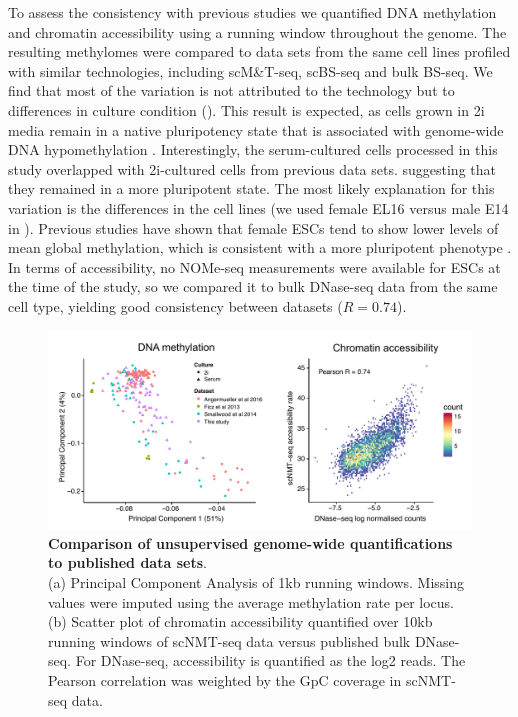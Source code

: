 To assess the consistency with previous studies we quantified DNA methylation and chromatin accessibility using a running window throughout the genome. The resulting methylomes were compared to data sets from the same cell lines profiled with similar technologies, including scM\&T-seq\cite{Angermueller2016}, scBS-seq\cite{Smallwood2014} and bulk BS-seq\cite{Ficz2013}. We find that most of the variation is not attributed to the technology but to differences in culture condition (). This result is expected, as cells grown in 2i media remain in a native pluripotency state that is associated with genome-wide DNA hypomethylation \cite{Ficz2013}. Interestingly, the serum-cultured cells processed in this study overlapped with 2i-cultured cells from previous data sets. suggesting that they remained in a more pluripotent state. The most likely explanation for this variation is the differences in the cell lines (we used female EL16 versus male E14 in \cite{Angermueller2016,Smallwood2014,Ficz2013}). Previous studies have shown that female ESCs tend to show lower levels of mean global methylation, which is consistent with a more pluripotent phenotype \cite{Zvetkova2005}.\\

In terms of accessibility, no NOMe-seq measurements were available for ESCs at the time of the study, so we compared it to bulk DNase-seq data from the same cell type, yielding good consistency between datasets ($R=0.74$).
\begin{figure}[H]
	\centering
	\includegraphics[width=1.0\linewidth]{scNMT_comparison}
	\caption[]{\textbf{Comparison of unsupervised genome-wide quantifications to published data sets}.\\
	(a) Principal Component Analysis of 1kb running windows. Missing values were imputed using the average methylation rate per locus.\\
	(b) Scatter plot of chromatin accessibility quantified over 10kb running windows of scNMT-seq data versus published bulk DNase-seq. For DNase-seq, accessibility is quantified as the log2 reads. The Pearson correlation was weighted by the GpC coverage in scNMT-seq data. }
	\label{fig:scnmt_comparison}
\end{figure}


